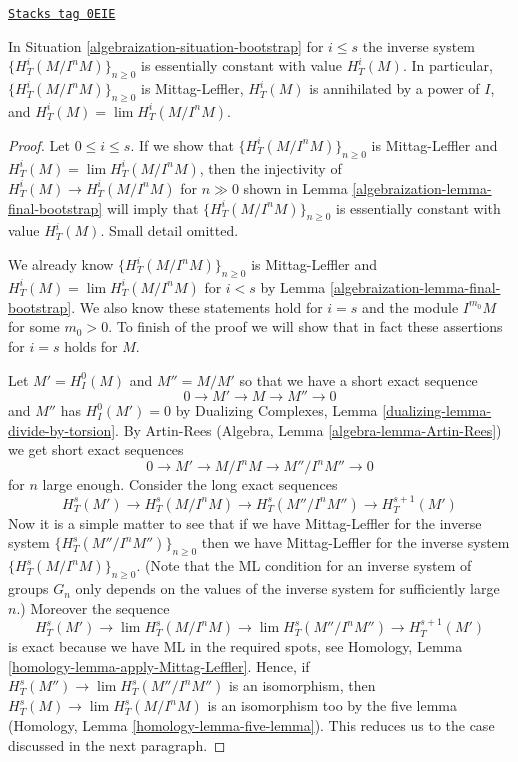 \begin{theorem}
\label{algebraization-theorem-final-bootstrap}
\href{https://stacks.math.columbia.edu/tag/0EIE}{\texttt{Stacks tag 0EIE}}

In Situation \ref{algebraization-situation-bootstrap} for $i \leq s$ the inverse system
$\{H^i_T(M/I^nM)\}_{n \geq 0}$ is essentially constant with value $H^i_T(M)$.
In particular, $\{H^i_T(M/I^nM)\}_{n \geq 0}$ is Mittag-Leffler,
$H^i_T(M)$ is annihilated by a power of $I$, and
$H^i_T(M) = \lim H^i_T(M/I^nM)$.
\end{theorem}

\begin{proof}

Let $0 \leq i \leq s$.
If we show that $\{H^i_T(M/I^nM)\}_{n \geq 0}$ is Mittag-Leffler and
$H^i_T(M) = \lim H^i_T(M/I^nM)$, then the injectivity of
$H^i_T(M) \to H^i_T(M/I^nM)$ for $n \gg 0$ shown in
Lemma \ref{algebraization-lemma-final-bootstrap} will imply that
$\{H^i_T(M/I^nM)\}_{n \geq 0}$ is essentially constant with value $H^i_T(M)$.
Small detail omitted.

\medskip\noindent
We already know $\{H^i_T(M/I^nM)\}_{n \geq 0}$ is Mittag-Leffler and
$H^i_T(M) = \lim H^i_T(M/I^nM)$ for $i < s$ by
Lemma \ref{algebraization-lemma-final-bootstrap}. We also know these statements hold
for $i = s$ and the module $I^{m_0}M$ for some $m_0 > 0$.
To finish of the proof we will show that in fact these
assertions for $i = s$ holds for $M$.

\medskip\noindent
Let $M' = H^0_I(M)$ and $M'' = M/M'$ so that we have a short exact
sequence
$$
0 \to M' \to M \to M'' \to 0
$$
and $M''$ has $H^0_I(M') = 0$ by
Dualizing Complexes, Lemma \ref{dualizing-lemma-divide-by-torsion}.
By Artin-Rees (Algebra, Lemma \ref{algebra-lemma-Artin-Rees})
we get short exact sequences
$$
0 \to M' \to M/I^n M \to M''/I^n M'' \to 0
$$
for $n$ large enough. Consider the long exact sequences
$$
H^s_T(M') \to
H^s_T(M/I^nM) \to
H^s_T(M''/I^nM'') \to
H^{s + 1}_T(M')
$$
Now it is a simple matter to see that if we have Mittag-Leffler
for the inverse system $\{H^s_T(M''/I^nM'')\}_{n \geq 0}$
then we have Mittag-Leffler for the inverse system
$\{H^s_T(M/I^nM)\}_{n \geq 0}$.
(Note that the ML condition for an inverse system of groups $G_n$
only depends on the values of the inverse system for sufficiently large $n$.)
Moreover the sequence
$$
H^s_T(M') \to
\lim H^s_T(M/I^nM) \to
\lim H^s_T(M''/I^nM'') \to
H^{s + 1}_T(M')
$$
is exact because we have ML in the required spots, see
Homology, Lemma \ref{homology-lemma-apply-Mittag-Leffler}.
Hence, if $H^s_T(M'') \to \lim H^s_T(M''/I^nM'')$
is an isomorphism, then
$H^s_T(M) \to \lim H^s_T(M/I^nM)$
is an isomorphism too by the five lemma
(Homology, Lemma \ref{homology-lemma-five-lemma}).
This reduces us to the case discussed in the next paragraph.


\end{proof}
